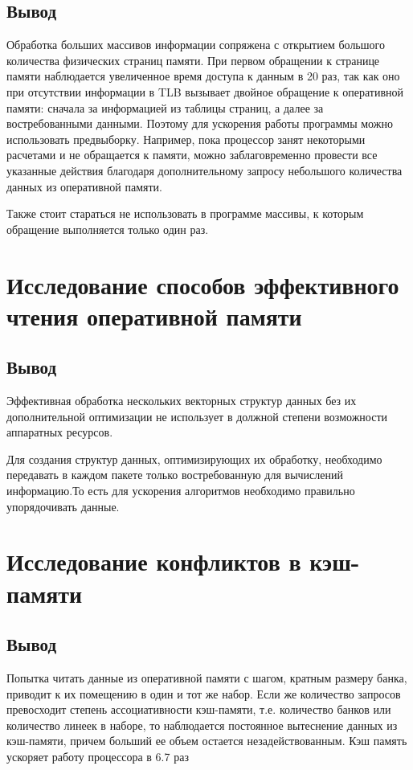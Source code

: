 \section*{Вывод}
 Обработка больших массивов информации сопряжена с открытием большого количества физических страниц памяти. При первом обращении к странице памяти наблюдается увеличенное время доступа к данным в 20 раз, так как оно при отсутствии информации в TLB вызывает двойное обращение к оперативной памяти: сначала за информацией из таблицы страниц, а далее за востребованными данными. Поэтому для ускорения работы программы можно использовать предвыборку. Например, пока процессор занят некоторыми расчетами и не обращается к памяти, можно заблаговременно провести все указанные действия благодаря дополнительному запросу небольшого количества данных из оперативной памяти. 

Также стоит стараться не использовать в программе массивы, к которым обращение выполняется только один раз.


\chapter*{Исследование способов эффективного чтения оперативной памяти}




\section*{Вывод}
Эффективная обработка нескольких векторных структур данных без их дополнительной оптимизации не использует в должной степени возможности аппаратных ресурсов. 

Для создания структур данных, оптимизирующих их обработку, необходимо передавать в каждом пакете только востребованную для вычислений информацию.То есть для ускорения алгоритмов необходимо правильно упорядочивать данные.


\chapter*{Исследование конфликтов в кэш-памяти}





\section*{Вывод}
Попытка читать данные из оперативной памяти с шагом, кратным размеру банка, приводит к их помещению в один и тот же набор. Если же количество запросов превосходит степень ассоциативности кэш-памяти, т.е. количество банков или количество линеек в наборе, то наблюдается постоянное вытеснение данных из кэш-памяти, причем больший ее объем остается незадействованным. Кэш память ускоряет работу процессора в 6.7 раз


